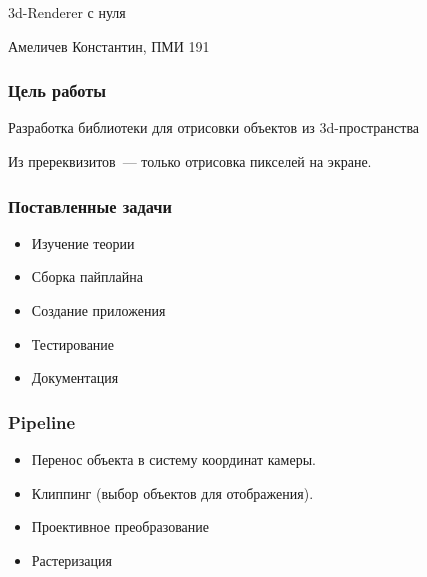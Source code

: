 \documentclass{beamer}
\title{}
\date{2021}
\author{Константин Амеличев}
\begin{document}
\begin{frame}
\begin{center}


{\large \scshape

\bigskip

\bigskip

3d-Renderer с нуля

\bigskip
}



Амеличев Константин, ПМИ 191\\

\bigskip

\bigskip
\bigskip
\bigskip
\bigskip

\end{center}
\end{frame}

\begin{frame}

\frametitle{Цель работы}

Разработка библиотеки для отрисовки объектов из 3d-пространства

\bigskip

Из пререквизитов~--- только отрисовка пикселей на экране.

\end{frame}

\begin{frame}

\frametitle{Поставленные задачи}

\begin{itemize}
\item Изучение теории
\item Сборка пайплайна
\item Создание приложения
\item Тестирование
\item Документация
\end{itemize}

\end{frame}


\begin{frame}
\frametitle{Pipeline}

\begin{itemize}
\item Перенос объекта в систему координат камеры.
\item Клиппинг (выбор объектов для отображения).
\item Проективное преобразование
\item Растеризация
\end{itemize}

\end{frame}
\end{document}
